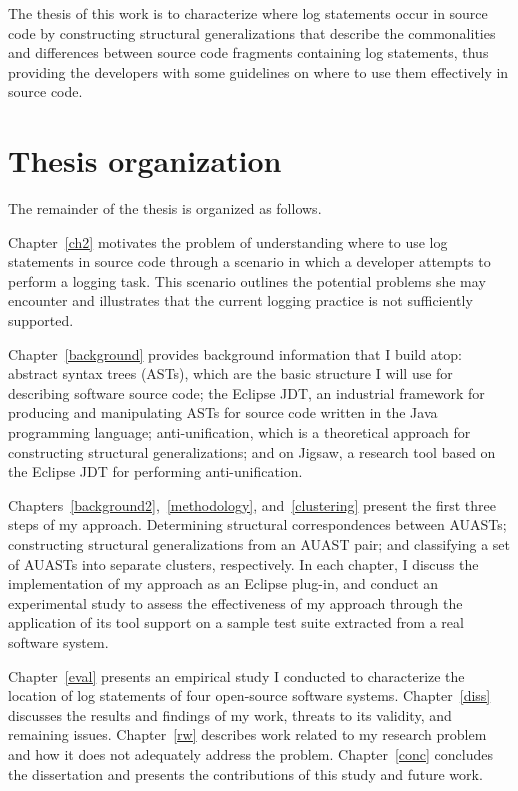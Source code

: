 The thesis of this work is to characterize where log statements occur in source code by constructing structural generalizations that describe the commonalities and differences between source code fragments containing log statements, thus providing the developers with some guidelines on where to use them effectively in source code. 

\section{Thesis organization} \label{intro-org}
The remainder of the thesis is organized as follows.

Chapter~\ref{ch2} motivates the problem of understanding where to use log statements in source code through a scenario in which a developer attempts to perform a logging task. This scenario outlines the potential problems she may encounter and illustrates that the current logging practice is not sufficiently supported.

Chapter~\ref{background} provides background information that I build atop: abstract syntax trees (ASTs), which are the basic structure I will use for describing software source code; the Eclipse JDT, an industrial framework for producing and manipulating ASTs for source code written in the Java programming language; anti-unification, which is a theoretical approach for constructing structural generalizations; and on Jigsaw, a research tool based on the Eclipse JDT for performing anti-unification.

Chapters~\ref{background2},~\ref{methodology}, and~\ref{clustering} present the first three steps of my approach. Determining structural correspondences between AUASTs; constructing structural generalizations from an AUAST pair; and classifying a set of AUASTs into separate clusters, respectively. In each chapter, I discuss the implementation of my approach as an Eclipse plug-in, and conduct an experimental study to assess the effectiveness of my approach through the application of its tool support on a sample test suite extracted from a real software system.



Chapter~\ref{eval} presents an empirical study I conducted to characterize the location of log statements of four open-source software systems. Chapter~\ref{diss} discusses the results and findings of my work, threats to its validity, and remaining issues. Chapter~\ref{rw} describes work related to my research problem and how it does not adequately address the problem. Chapter~\ref{conc} concludes the dissertation and presents the contributions of this study and future work. %



